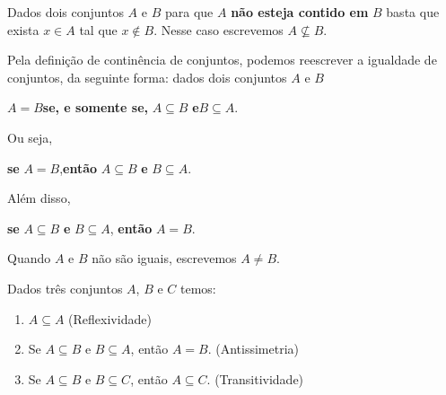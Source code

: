\documentclass{beamer}
\begin{document}
    \begin{frame}

        \begin{observacao}
            Dados dois conjuntos $A$ e $B$ \pause para que $A$ \textbf{não esteja contido em} $B$ basta \pause que exista $x \in A$ tal que $x \notin B$. \pause Nesse caso escrevemos $A \nsubseteq B$.
        \end{observacao}
    \end{frame}
    \begin{frame}
        \vspace{.4cm}
        Pela definição de continência de conjuntos, \pause podemos reescrever a igualdade de conjuntos, da seguinte forma: \pause dados dois conjuntos $A$ e $B$\pause
        \begin{center}
            $A = B$\quad \textbf{se, e somente se,} \pause\quad $A \subseteq B$ \quad\pause \textbf{e}\quad $B \subseteq A$.\pause
        \end{center}

        Ou seja,
        \begin{center}
            \textbf{se} $A = B$,\textbf{então} $A \subseteq B$ \textbf{e} $B \subseteq A$.\pause
        \end{center}

        Além disso,
        \begin{center}
            \textbf{se} $A \subseteq B$ \textbf{e} $B \subseteq A$, \textbf{então} $A = B$.\pause
        \end{center}

        Quando $A$ e $B$ não são iguais, escrevemos $A \neq B$.\pause

        \begin{proposicao}
            Dados três conjuntos $A$, $B$ e $C$ temos:\pause
            \begin{enumerate}[label={\roman*})]
                \item $A\subseteq A$ (Reflexividade)\pause
                \item Se $A\subseteq B \mbox{ e } B\subseteq A$, então $A=B$. (Antissimetria)\pause
                \item Se $A\subseteq B$ e $B\subseteq C$, então $A\subseteq C$. (Transitividade)
            \end{enumerate}
        \end{proposicao}
    \end{frame}
\end{document}
